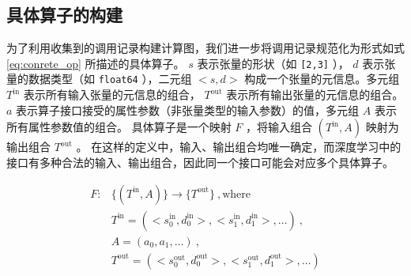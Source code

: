 

    

\subsection{具体算子的构建}
\label{sec:build_cop}

为了利用收集到的调用记录构建计算图，我们进一步将调用记录规范化为形式如式 \eqref{eq:conrete_op} 所描述的具体算子。
$s$ 表示张量的形状（如 \texttt{[2,3]} ）， $d$ 表示张量的数据类型（如 \texttt{float64} ），二元组 $<s, d>$ 构成一个张量的元信息。多元组 $T^\text{in}$ 表示所有输入张量的元信息的组合， $T^\text{out}$ 表示所有输出张量的元信息的组合。 $a$ 表示算子接口接受的属性参数（非张量类型的输入参数）的值，多元组 $A$ 表示所有属性参数值的组合。
具体算子是一个映射 $F$ ，将输入组合 $(T^\text{in}, A)$ 映射为输出组合 $T^\text{out}$ 。
在这样的定义中，输入、输出组合均唯一确定，而深度学习中的接口有多种合法的输入、输出组合，因此同一个接口可能会对应多个具体算子。

\begin{equation}
\label{eq:conrete_op}
\begin{aligned}
F: &\{(T^\text{in}, A)\} \rightarrow \{T^\text{out}\} ~, \text{where} \\
&T^\text{in} = (<s^\text{in}_0, d^\text{in}_0>, <s^\text{in}_1, d^\text{in}_1>, \dots) ~, \\
&A = (a_0, a_1, \dots) ~, \\
&T^\text{out} = (<s^\text{out}_0, d^\text{out}_0>, <s^\text{out}_1, d^\text{out}_1>, \dots)
\end{aligned}
\end{equation}



